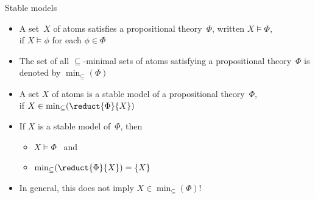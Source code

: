 \begin{frame}{Stable models}
  \begin{itemize}
  \item<1->
    A set~$X$ of atoms satisfies a propositional theory~$\Phi$, written $X\models\Phi$,
    \\
    if $X\models \phi$ for each $\phi\in\Phi$
  \item<2->
    The set of all $\subseteq$-minimal sets of atoms satisfying a propositional
    theory~$\Phi$ is denoted by $\min_\subseteq(\Phi)$
    \medskip
  \item<3->
    A set $X$ of atoms is a \alert{stable model} of a propositional theory~$\Phi$,
    \\
    if $X\in\min_\subseteq(\reduct{\Phi}{X})$
    \medskip
  \item<4->
    If $X$ is a stable model of~$\Phi$, then
    \begin{itemize}
    \item $X\models\Phi$ ~and
    \item $\min_\subseteq(\reduct{\Phi}{X})=\{X\}$
    \end{itemize}
  \item<5-> 
    In general, this does not imply $X\in\min_\subseteq(\Phi)$!
  \end{itemize}
\end{frame}
